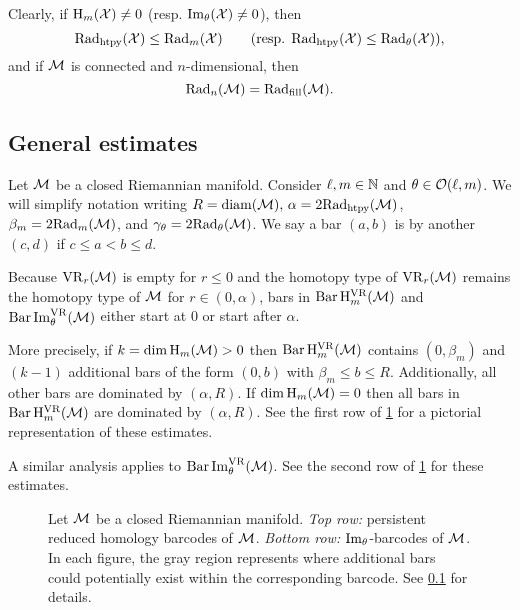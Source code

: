 Clearly, if \(\mathrm{H}_m(\mathcal{X}) \neq 0\) (resp. \(\operatorname{Im}_\theta(\mathcal{X}) \neq 0\)), then
\[
    \mathrm{Rad}_{\mathrm{htpy}}(\mathcal{X}) \leq \mathrm{Rad}_{m}(\mathcal{X}) \qquad (\text{resp. }\mathrm{Rad}_{\mathrm{htpy}}(\mathcal{X}) \leq  \mathrm{Rad}_{\theta}(\mathcal{X})),
\]
and if $\mathcal{M}$ is connected and $n$-dimensional, then
\[\mathrm{Rad}_{n}(\mathcal{M}) = \mathrm{Rad}_{\mathrm{fill}}(\mathcal{M}).\]

\subsection{General estimates}\label{ss:barcode_general}

Let \(\mathcal{M}\) be a closed Riemannian manifold. 
Consider \(\ell, m \in \mathbb{N}\) and \(\theta \in \mathcal{O}(\ell,m)\).
We will simplify notation writing \(R = \operatorname{diam}(\mathcal{M}),\, \alpha = 2\mathrm{Rad}_{\mathrm{htpy}}(\mathcal{M})\), \(\beta_m = 2\mathrm{Rad}_{m}(\mathcal{M})\), and \(\gamma_\theta = 2\mathrm{Rad}_{\theta}(\mathcal{M})\). 
We say a bar $(a, b)$ is  by another $(c,d)$ if $c \leq a < b \leq d$.

Because $\mathrm{VR}_r(\mathcal{M})$ is empty for \(r \leq 0\) and the homotopy type of $\mathrm{VR}_r(\mathcal{M})$ remains the homotopy type of $\mathcal{M}$ for $r \in (0, \alpha)$, bars in \(\operatorname{Bar} \mathrm{H}_m^{\mathrm{VR}}(\mathcal{M})\) and $\operatorname{Bar}\operatorname{Im}_\theta^{\mathrm{VR}}(\mathcal{M})$ either start at $0$ or start after $\alpha$.

More precisely,
if \(k = \dim \operatorname{H}_m(\mathcal{M}) > 0\) then $\operatorname{Bar}\mathrm{H}_m^{\mathrm{VR}}(\mathcal{M})$ contains $(0, \beta_m)$ and \((k - 1)\) additional bars of the form \((0, b)\) with \(\beta_m \leq b \leq R\).
Additionally, all other bars are dominated by \((\alpha, R)\).
If \(\dim \operatorname{H}_m(\mathcal{M}) = 0\) then all bars in \(\operatorname{Bar}\mathrm{H}_m^{\mathrm{VR}}(\mathcal{M})\) are dominated by \((\alpha, R)\).
See the first row of \cref{fig:barcodes_general} for a pictorial representation of these estimates.

A similar analysis applies to $\operatorname{Bar}\operatorname{Im}_\theta^{\mathrm{VR}}(\mathcal{M})$.
See the second row of \cref{fig:barcodes_general} for these estimates.

\begin{figure}
	\centering
	
	\caption{Let $\mathcal{M}$ be a closed Riemannian manifold.
    \emph{Top row:} persistent reduced homology barcodes of $\mathcal{M}$.
	\emph{Bottom row:} $\operatorname{Im}_\theta$-barcodes of $\mathcal{M}$.
    In each figure, the gray region represents where additional bars could potentially exist within the corresponding barcode.
    See \cref{ss:barcode_general} for details.}
	\label{fig:barcodes_general}
\end{figure}